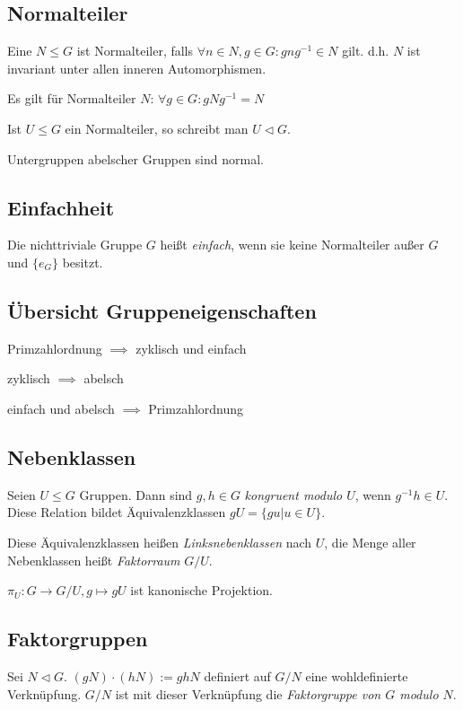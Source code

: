 \subsection*{Normalteiler}

Eine $N \leq G$ ist Normalteiler, falls $\forall n \in N, g \in G : gng^{-1} \in N$ gilt. d.h. $N$ ist invariant unter allen inneren Automorphismen.

Es gilt für Normalteiler $N$: $\forall g \in G : gNg^{-1} = N$

Ist $U \leq G$ ein Normalteiler, so schreibt man $U \triangleleft G$.

Untergruppen abelscher Gruppen sind normal.

\subsection*{Einfachheit}

Die nichttriviale Gruppe $G$ heißt \emph{einfach}, wenn sie keine Normalteiler außer $G$ und $\{e_G\}$ besitzt.

\subsection*{Übersicht Gruppeneigenschaften}

Primzahlordnung $\implies$ zyklisch und einfach

zyklisch $\implies$ abelsch

einfach und abelsch $\implies$ Primzahlordnung

\subsection*{Nebenklassen}

Seien $U \leq G$ Gruppen. Dann sind $g, h \in G$ \emph{kongruent modulo $U$}, wenn $g^{-1}h \in U$. Diese Relation bildet Äquivalenzklassen $gU = \{gu | u \in U\}$.

Diese Äquivalenzklassen heißen \emph{Linksnebenklassen} nach $U$, die Menge aller Nebenklassen heißt \emph{Faktorraum} $G/U$.

$\pi_U : G \rightarrow G/U, g \mapsto gU$ ist kanonische Projektion.

\subsection*{Faktorgruppen}

Sei $N \triangleleft G$. $(gN) \cdot (hN) := ghN$ definiert auf $G/N$ eine wohldefinierte Verknüpfung. $G/N$ ist mit dieser Verknüpfung die \emph{Faktorgruppe von $G$ modulo $N$}.

